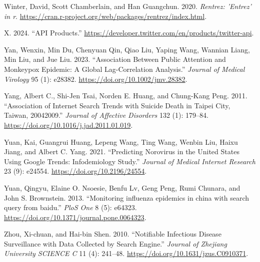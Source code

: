 \documentclass[
  12pt,
]{article}
\newlength{\cslhangindent}
\newenvironment{CSLReferences}[2] %
 {\begin{list}{}{%
  \setlength{\itemindent}{0pt}
  \setlength{\leftmargin}{0pt}
  \setlength{\parsep}{0pt}
  \ifodd #1
   \setlength{\leftmargin}{\cslhangindent}
   \setlength{\itemindent}{-1\cslhangindent}
  \fi
  \setlength{\itemsep}{#2\baselineskip}}}
 {\end{list}}
\begin{document}
\begin{CSLReferences}{1}{0}
Winter, David, Scott Chamberlain, and Han Guangchun. 2020.
\emph{Rentrez: 'Entrez' in r}.
\url{https://cran.r-project.org/web/packages/rentrez/index.html}.

X. 2024. {``API Products.''}
\url{https://developer.twitter.com/en/products/twitter-api}.

Yan, Wenxin, Min Du, Chenyuan Qin, Qiao Liu, Yaping Wang, Wannian Liang,
Min Liu, and Jue Liu. 2023. {``Association Between Public Attention and
Monkeypox Epidemic: A Global Lag{-}Correlation Analysis.''}
\emph{Journal of Medical Virology} 95 (1): e28382.
\url{https://doi.org/10.1002/jmv.28382}.

Yang, Albert C., Shi-Jen Tsai, Norden E. Huang, and Chung-Kang Peng.
2011. {``Association of Internet Search Trends with Suicide Death in
Taipei City, Taiwan, 2004{\textendash}2009.''} \emph{Journal of
Affective Disorders} 132 (1): 179--84.
\url{https://doi.org/10.1016/j.jad.2011.01.019}.

Yuan, Kai, Guangrui Huang, Lepeng Wang, Ting Wang, Wenbin Liu, Haixu
Jiang, and Albert C. Yang. 2021. {``Predicting Norovirus in the United
States Using Google Trends: Infodemiology Study.''} \emph{Journal of
Medical Internet Research} 23 (9): e24554.
\url{https://doi.org/10.2196/24554}.

Yuan, Qingyu, Elaine O. Nsoesie, Benfu Lv, Geng Peng, Rumi Chunara, and
John S. Brownstein. 2013. {``Monitoring influenza epidemics in china
with search query from baidu.''} \emph{PloS One} 8 (5): e64323.
\url{https://doi.org/10.1371/journal.pone.0064323}.

Zhou, Xi-chuan, and Hai-bin Shen. 2010. {``Notifiable Infectious Disease
Surveillance with Data Collected by Search Engine.''} \emph{Journal of
Zhejiang University SCIENCE C} 11 (4): 241--48.
\url{https://doi.org/10.1631/jzus.C0910371}.

\end{CSLReferences}
\end{document}
